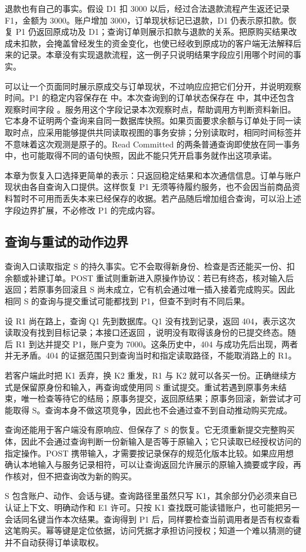退款也有自己的事实。假设 D1 扣 3000 以后，经过合法退款流程产生返还记录 F1，金额为 3000。账户增加 3000，订单现状标记已退款，D1 仍表示原扣款。恢复 P1 仍返回原成功及 D1；查询订单则展示扣款与退款的关系。把原购买结果改成未扣款，会掩盖曾经发生的资金变化，也使已经收到原成功的客户端无法解释后来的记录。本章没有实现退款流程，这一例子只说明结果字段应引用哪个时间的事实。

可以让一个页面同时展示原成交与订单现状，不过响应应把它们分开，并说明观察时间。P1 的稳定内容保存在  中。本次查询到的订单状态保存在  中，其中还包含观察时间字段 。服务用这个字段记录本次观察时点，帮助调用方判断资料新旧。它本身不证明两个查询来自同一数据库快照。如果页面要求余额与订单处于同一读取时点，应采用能够提供共同读取视图的事务安排；分别读取时，相同时间标签并不意味着这次观测是原子的。Read Committed 的两条普通查询即使放在同一事务中，也可能取得不同的语句快照，因此不能只凭开启事务就作出这项承诺。



本章为恢复入口选择更简单的表示：只返回稳定结果和本次通信信息。订单与账户现状由各自查询入口提供。这样恢复 P1 无须等待履约服务，也不会因当前商品资料暂时不可用而丢失本来已经保存的收据。若产品随后增加组合查询，可以沿上述字段边界扩展，不必修改 P1 的完成内容。

\subsection*{查询与重试的动作边界}

查询入口读取指定 S 的持久事实。它不会取得新身份、检查是否还能买一份、扣余额或补建订单。POST 重试则重新进入原操作协议：若已有终态，核对输入后返回；若原事务回滚且 S 尚未成立，它有机会通过唯一插入接着完成购买。因此相同 S 的查询与提交重试可能都找到 P1，但查不到时有不同后果。

设 R1 尚在路上，查询 Q1 先到数据库。Q1 没有找到记录，返回 404，表示这次读取没有找到目标记录；本接口还返回 ，说明没有取得该身份的已提交终态。随后 R1 到达并提交 P1，账户变为 7000。这条历史中，404 与成功先后出现，两者并无矛盾。404 的证据范围只到查询当时和指定读取路径，不能取消路上的 R1。

若客户端此时把 K1 丢弃，换 K2 重发，R1 与 K2 就可以各买一份。正确继续方式是保留原身份和输入，再查询或使用同 S 重试提交。重试若遇到原事务未结束，唯一检查等待它的结局；原事务提交，返回原结果；原事务回滚，新尝试才可能取得 S。查询本身不做这项竞争，因此也不会通过查不到自动推动购买完成。



查询还能用于客户端没有原响应、但保存了 S 的恢复。它无须重新提交完整购买体，因此不会通过查询判断一份新输入是否等于原输入；它只读取已经授权访问的指定操作。POST 携带输入，才需要按记录保存的规范化版本比较。如果应用想确认本地输入与服务记录相符，可以让查询返回允许展示的原输入摘要或字段，再作核对，但不把查询改为新的购买。

S 包含账户、动作、会话与键。查询路径里虽然只写 K1，其余部分仍必须来自已认证上下文、明确动作和 E1 许可。只按 K1 查找既可能读错账户，也可能把另一会话同名键当作本次结果。查询得到 P1 后，同样要检查当前调用者是否有权查看这笔购买。幂等键是定位依据，访问凭据才承担访问授权；知道一个难以猜测的键并不自动获得订单读取权。
\FloatBarrier
